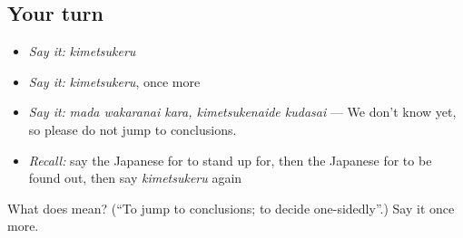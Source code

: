 \subsection*{Your turn}
\begin{itemize}
\raggedright
  \item \emph{Say it:} \emph{kimetsukeru}
  \item \emph{Say it:} \emph{kimetsukeru}, once more
  \item \emph{Say it:} \emph{mada wakaranai kara, kimetsukenaide kudasai} — We don't know yet, so please do not jump to conclusions.
  \item \emph{Recall:} say the Japanese for to stand up for, then the Japanese for to be found out, then say \emph{kimetsukeru} again
\end{itemize}

\begin{tcolorbox}[breakable,colback=teal!4,colframe=teal!35!black,title={Before you move on}]
What does  mean? (\textquotedblleft{}To jump to conclusions; to decide one-sidedly\textquotedblright{}.) Say it once more.
\end{tcolorbox}
